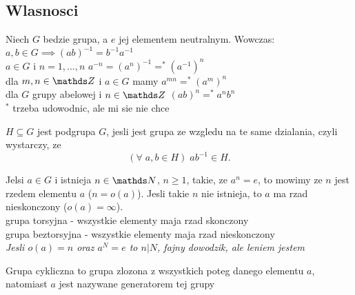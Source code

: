 \subsection{Wlasnosci}
\begin{multicols}{2}

    Niech $G$ bedzie grupa, a $e$ jej elementem neutralnym. Wowczas:\smallskip\\
    \point $a,b\in G\implies (ab)^{-1}=b^{-1}a^{-1}$\smallskip\\
    \point $a\in G$ i $n=1, ..., n$ $a^{-n} = (a^n)^{-1} =^* (a^{-1})^n$\smallskip\\
    \point dla $m,n\in\Z$ i $a\in G$ mamy $a^{mn}=^* (a^m)^n$\smallskip\\
    \point dla $G$ grupy abelowej i $n\in\Z$ $(ab)^n=^*a^nb^n$\smallskip\\
    $^*$ trzeba udowodnic, ale mi sie nie chce\medskip

    $H\subseteq G$ jest {\color{def}podgrupa} $G$, jesli jest grupa ze wzgledu na te same dzialania, czyli wystarczy, ze 
    $$(\forall\;a,b\in H)\; ab^{-1}\in H.$$

    \medskip

    Jelsi $a\in G$ i istnieja $n\in\N$, $n\geq 1$, takie, ze $a^n=e$, to mowimy ze $n$ jest {\color{def}rzedem elementu} $a$ ($n=o(a)$). Jesli takie $n$ nie istnieja, to $a$ ma {\color{acc}rzad nieskonczony} ($o(a)=\infty$).\smallskip\\
    {\color{acc}\point} {\color{def}grupa torsyjna} - wszystkie elementy maja rzad skonczony\smallskip\\
    {\color{acc}\point} {\color{def}grupa beztorsyjna} - wszystkie elementy maja rzad nieskonczony\smallskip\\
    \emph{Jesli $o(a) = n$ oraz $a^N=e$ to $n|N$, fajny dowodzik, ale leniem jestem}\medskip

    {\color{def}Grupa cykliczna} to grupa zlozona z wszystkich poteg danego elementu $a$, natomiast $a$ jest nazywane {\color{acc}generatorem} tej grupy

\end{multicols}
\newpage

